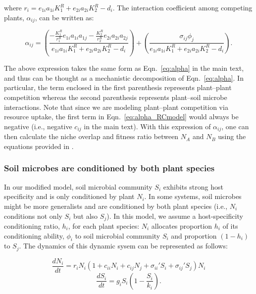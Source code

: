 \noindent where $r_{i} = e_{1i}a_{1i}K_{1}^{R} + e_{2i}a_{2i}K_{2}^{R} - d_{i}$. The interaction coefficient among competing plants, $\alpha_{ij}$, can be written as:

\begin{equation}
\alpha_{ij} =
\left ( \frac{-\frac{ K_{1}^{R}}{r_{1}^{R}}e_{1i}a_{1i}a_{1j} - \frac{K_{2}^{R}}{r_{2}^{R}}e_{2i}a_{2i}a_{2j}}
{e_{1i}a_{1i}K_{1}^{R} + e_{2i}a_{2i}K_{2}^{R} - d_{i}}\right )
+ \left ( \frac{\sigma_{ij}\phi_{j}}
{e_{1i}a_{1i}K_{1}^{R} + e_{2i}a_{2i}K_{2}^{R} - d_{i}}\right ).
\tag{S4.6}\label{eq:alpha_RCmodel}
\end{equation}

\noindent The above expression takes the same form as Eqn.~\ref{eq:alpha} in the main text, and thus can be thought as a mechanistic decomposition of Eqn.~\ref{eq:alpha}. In particular, the term enclosed in the first parenthesis represents plant--plant competition whereas the second parenthesis represents plant--soil microbe interactions. Note that since we are modeling plant--plant competition via resource uptake, the first term in Eqn.~\ref{eq:alpha_RCmodel} would always be negative (i.e., negative $c_{ij}$ in the main text).
With this expression of $\alpha_{ij}$, one can then calculate the niche overlap and fitness ratio between $N_{A}$ and $N_{B}$ using the equations provided in \citet{Chesson1990, Chesson2008b}.
\par


\subsubsection*{Soil microbes are conditioned by both plant species}
In our modified \citet{Eppinga2006} model, soil microbial community $S_{i}$ exhibits strong host specificity and is only conditioned by plant $N_{i}$. In some systems, soil microbes might be more generalists and are conditioned by both plant species (i.e., $N_{i}$ conditions not only $S_{i}$ but also $S_{j}$). In this model, we assume a host-specificity conditioning ratio, $h_{i}$, for each plant species: $N_{i}$ allocates proportion $h_{i}$ of its conditioning ability, $\phi_{i}$ to soil microbial community $S_{i}$ and proportion $\left(1-h_{i}\right)$ to $S_{j}$. The dynamics of this dynamic sysem can be represented as follows:

\begin{equation}
\frac{dN_{i}}{dt} = r_{i}N_{i} \left( 1 + c_{ii}N_{i}+c_{ij}N_{j} + \sigma_{ii}'S_{i}+\sigma_{ij}'S_{j} \right)N_{i}
\tag{S4.7}\label{eq:Plant_Cocondition}
\end{equation}
\begin{equation}
\frac{dS_{i}}{dt } = g_{i}S_{i}\left ( 1-\frac{S_{i}}{k_{i}}\right ) .
\tag{S4.8}\label{eq:Soil_Cocondition}
\end{equation}

